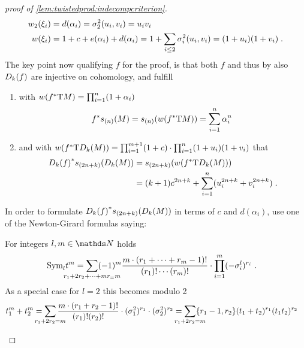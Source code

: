 \begin{proof}[proof of \autoref{lem:twistedprod:indecompcriterion}]
\begin{align*}
    {w_{2}}(\xi_i) &= d(\alpha_i)   = \sigma_{2}^{2}(u_i, v_i) = u_iv_i \\
    {w}(\xi_i)  &= 1+c+e(\alpha_i)+d(\alpha_i)
                 = 1+\sum_{i\leq2}\sigma_{i}^{2}(u_i,v_i) = (1+u_i)(1+v_i)
                 \;.
  \end{align*}
  The key point now qualifying $f$ for the proof, is that both $f$ and
  thus by
  also $D_{k}({f})$ are injective on cohomology, and fulfill
  \begin{enumerate}
  \item with ${w}({f}^*\mathrm{T}M) = \prod_{i=1}^n (1+\alpha_i)$
    \begin{gather}\label{eq:lem:twistedprod:indecompcriterion:sM}
      {f}^* s_{(n)}(M)
      = s_{(n)}({w}({f}^*\mathrm{T}M))
      = \sum_{i=1}^n \alpha_i^n
      \;
    \end{gather}
  \item and with
    ${w}({f}^*\mathrm{T}D_{k}({M}))
    = \prod_{i=1}^{m+1}(1+c) \cdot \prod_{i=1}^n
    (1+u_i)(1+v_i)$
    that
    \begin{align}\notag
      {D_{k}({f})}^* s_{(2n+k)}(D_{k}({M}))
      &= s_{(2n+k)}({w}({f}^*\mathrm{T}D_{k}({M}))) \\
      \label{eq:lem:twistedprod:indecompcriterion:sDkM}
      &= (k+1)c^{2n+k} + \sum_{i=1}^n (u_i^{2n+k} + v_i^{2n+k})
        \;.
    \end{align}
  \end{enumerate}
  In order to formulate
  ${D_{k}({f})}^*s_{(2n+k)}(D_{k}({M}))$ 
  in terms of $c$ and $d(\alpha_i)$,
  use one of the Newton-Girard formulas %
  saying:
  \begin{Lem}
    For integers $l, m\in\Nat$ holds
    \begin{align*}
      \symm{l} t^m
      &= \sum_{\mathclap{r_1+2r_2+\dotsb+mr_=m}}
        (-1)^m \frac{m\cdot(r_1+\dotsb+r_m-1)!}{(r_1)!\dotsm(r_m)!}
        \cdot \prod_{i=1}^m (-\el i l)^{r_i}
        \;.
    \end{align*}
    As a special case for $l=2$ this becomes modulo 2
    \begin{align*}
      t_1^m + t_2^m
      &= \sum_{\mathclap{r_1+2r_2=m}}
        \frac{m\cdot(r_1+r_2-1)!}{(r_1)!(r_2)!}
        \cdot (\el 1 2)^{r_1} \cdot (\el 2 2)^{r_2}
      = \sum_{\mathclap{r_1+2r_2=m}}
        \altbinom{r_1-1}{r_2} (t_1+t_2)^{r_1}(t_1t_2)^{r_2}
    \end{align*}

\end{Lem}
\end{proof}
